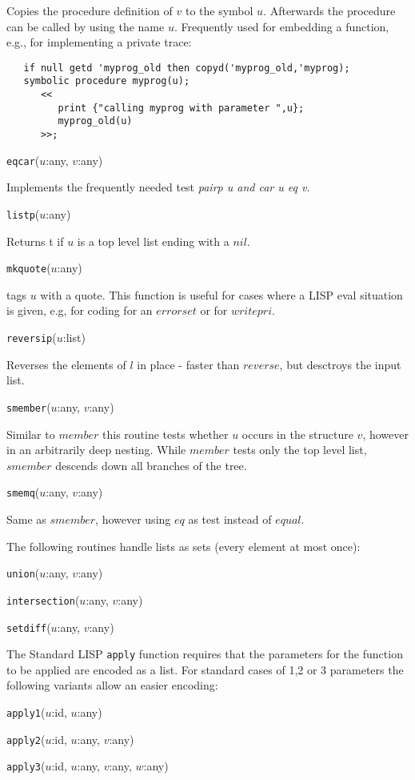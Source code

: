 \documentclass[11pt]{article}
\begin{document}
\noindent
Copies the procedure definition of $v$ to the symbol $u$. Afterwards
the procedure can be called by using the name $u$.  Frequently
used for embedding a function, e.g., for implementing a private
trace:
\begin{verbatim}
   if null getd 'myprog_old then copyd('myprog_old,'myprog);
   symbolic procedure myprog(u);
      <<
         print {"calling myprog with parameter ",u};
         myprog_old(u)
      >>;
\end{verbatim}

\vspace{5mm}
\texttt{eqcar}($u$:any, $v$:any)

\noindent
Implements the frequently needed test \emph{pairp u and car u eq v}.

\vspace{5mm}
\texttt{listp}($u$:any)

\noindent
Returns t if $u$ is a top level list ending with a $nil$.

\vspace{5mm}
\texttt{mkquote}($u$:any)

\noindent
tags $u$ with a quote. This function is useful for cases where
a LISP eval situation is given, e.g, for coding for an $errorset$
or for $writepri$.

\vspace{5mm}
\texttt{reversip}($u$:list)

\noindent
Reverses the elements of $l$ in place - faster than $reverse$, but
desctroys the input list.

\vspace{5mm}
\texttt{smember}($u$:any, $v$:any)

\noindent
Similar to $member$ this routine tests whether $u$ occurs in
the structure $v$, however in an arbitrarily deep nesting.
While $member$ tests only the top level
list, $smember$ descends down all branches of the tree.

\vspace{5mm}
\texttt{smemq}($u$:any, $v$:any)

\noindent
Same as $smember$, however using $eq$ as test instead of $equal$.

\vspace{5mm}
\noindent
The following routines handle lists as sets (every element
at most once):

\texttt{union}($u$:any, $v$:any)

\texttt{intersection}($u$:any, $v$:any)

\texttt{setdiff}($u$:any, $v$:any)  %

\vspace{5mm}
\noindent
The Standard LISP \texttt{apply} function requires that the parameters
for the function to be applied are encoded as a list. For standard
cases of 1,2 or 3 parameters the following variants allow an easier
encoding:

\texttt{apply1}($u$:id, $u$:any)

\texttt{apply2}($u$:id, $u$:any, $v$:any)

\texttt{apply3}($u$:id, $u$:any, $v$:any, $w$:any)

\printindex
\end{document}
